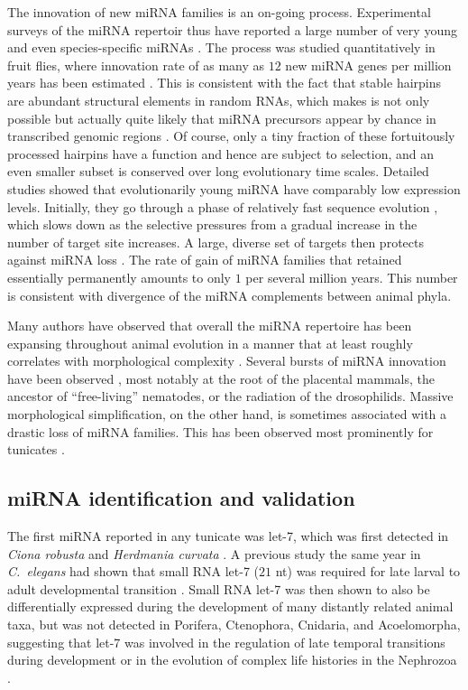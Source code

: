 \documentclass[graybox]{svmult}
\begin{document}
The innovation of new miRNA families is an on-going process. Experimental
surveys of the miRNA repertoir thus have reported a large number of very
young and even species-specific miRNAs \cite{Bentwich:05, Berezikov:06}. The
process was studied quantitatively in fruit flies, where innovation rate of
as many as $12$ new miRNA genes per million years has been estimated
\cite{Lu:08}. This is consistent with the fact that stable hairpins are
abundant structural elements in random RNAs, which makes is not only
possible but actually quite likely that miRNA precursors appear by chance
in transcribed genomic regions \cite{Tanzer:04a, CampoPaysaa:11, Marco:13}.
Of course, only a tiny fraction of these fortuitously processed hairpins
have a function and hence are subject to selection, and an even smaller
subset is conserved over long evolutionary time scales. Detailed studies
showed that evolutionarily young miRNA have comparably low expression
levels. Initially, they go through a phase of relatively fast sequence
evolution \cite{Liang:09, Meunier:12}, which slows down as the selective
pressures from a gradual increase in the number of target site increases. A
large, diverse set of targets then protects against miRNA loss
\cite{Lee:07a}. The rate of gain of miRNA families that retained
essentially permanently amounts to only $1$ per several million years. This
number is consistent with divergence of the miRNA complements between
animal phyla.

Many authors have observed that overall the miRNA repertoire has been
expansing throughout animal evolution in a manner that at least roughly
correlates with morphological complexity \cite{Hertel:06a, Sempere:06,
  Niwa:07, Prochnik:07, Lee:07a, Heimberg:08, Peterson:09,
  Berezikov:11}. Several bursts of miRNA innovation have been observed
\cite{Hertel:06a, Heimberg:08, Tanzer:10a, Hertel:15a}, most notably at the
root of the placental mammals, the ancestor of ``free-living'' nematodes,
or the radiation of the drosophilids.  Massive morphological
simplification, on the other hand, is sometimes associated with a drastic
loss of miRNA families. This has been observed most prominently for
tunicates \cite{Fu:08, Dai:09}.

\subsection{miRNA identification and validation}

The first miRNA reported in any tunicate was let-7, which was 
first detected in \textit{Ciona robusta} and \textit{Herdmania curvata} 
\cite{Pasquinelli2000}. A previous study the same year in \textit{C.\ elegans} 
had shown that small RNA let-7 ($21$ nt) was required for late larval to adult 
developmental transition \cite{Reinhart:2000mz}. Small RNA let-7 was then shown 
to also be differentially expressed during the development of many distantly 
related animal taxa, but was not detected in Porifera, Ctenophora, Cnidaria, 
and Acoelomorpha, suggesting that let-7 was involved in the regulation of late 
temporal transitions during development or in the evolution of complex life 
histories in the Nephrozoa \cite{Pasquinelli2000,Pasquinelli2003}.
\end{document}
